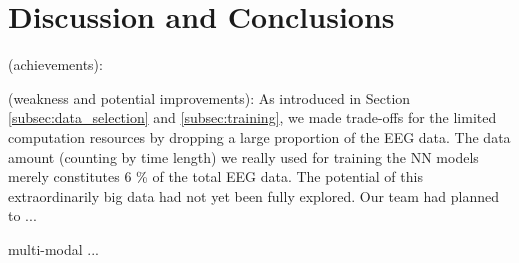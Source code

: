 \section{Discussion and Conclusions}
\label{sec:discu}


(achievements):

(weakness and potential improvements):
As introduced in Section \ref{subsec:data_selection} and \ref{subsec:training}, we made trade-offs for the limited computation resources by dropping a large proportion of the EEG data. The data amount (counting by time length) we really used for training the NN models merely constitutes 6 \% of the total EEG data. The potential of this extraordinarily big data had not yet been fully explored. Our team had planned to ...


multi-modal ...
